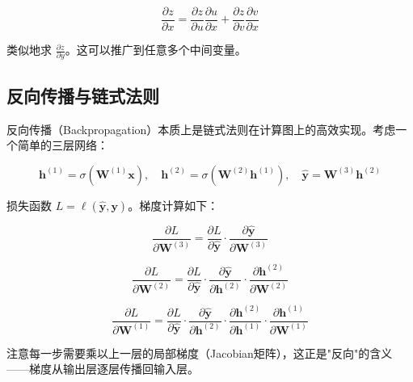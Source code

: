 \[
\frac{\partial z}{\partial x} = \frac{\partial z}{\partial u}\frac{\partial u}{\partial x} + \frac{\partial z}{\partial v}\frac{\partial v}{\partial x}
\]

类似地求 $\frac{\partial z}{\partial y}$。这可以推广到任意多个中间变量。

\subsection{反向传播与链式法则}

反向传播（Backpropagation）本质上是链式法则在计算图上的高效实现。考虑一个简单的三层网络：

\[
\mathbf{h}^{(1)} = \sigma(\mathbf{W}^{(1)}\mathbf{x}), \quad
\mathbf{h}^{(2)} = \sigma(\mathbf{W}^{(2)}\mathbf{h}^{(1)}), \quad
\hat{\mathbf{y}} = \mathbf{W}^{(3)}\mathbf{h}^{(2)}
\]

损失函数 $L = \ell(\hat{\mathbf{y}}, \mathbf{y})$。梯度计算如下：

\[
\frac{\partial L}{\partial \mathbf{W}^{(3)}} = \frac{\partial L}{\partial \hat{\mathbf{y}}} \cdot \frac{\partial \hat{\mathbf{y}}}{\partial \mathbf{W}^{(3)}}
\]

\[
\frac{\partial L}{\partial \mathbf{W}^{(2)}} = \frac{\partial L}{\partial \hat{\mathbf{y}}} \cdot
\frac{\partial \hat{\mathbf{y}}}{\partial \mathbf{h}^{(2)}} \cdot
\frac{\partial \mathbf{h}^{(2)}}{\partial \mathbf{W}^{(2)}}
\]

\[
\frac{\partial L}{\partial \mathbf{W}^{(1)}} = \frac{\partial L}{\partial \hat{\mathbf{y}}} \cdot
\frac{\partial \hat{\mathbf{y}}}{\partial \mathbf{h}^{(2)}} \cdot
\frac{\partial \mathbf{h}^{(2)}}{\partial \mathbf{h}^{(1)}} \cdot
\frac{\partial \mathbf{h}^{(1)}}{\partial \mathbf{W}^{(1)}}
\]

注意每一步需要乘以上一层的局部梯度（Jacobian矩阵），这正是"反向"的含义——梯度从输出层逐层传播回输入层。

